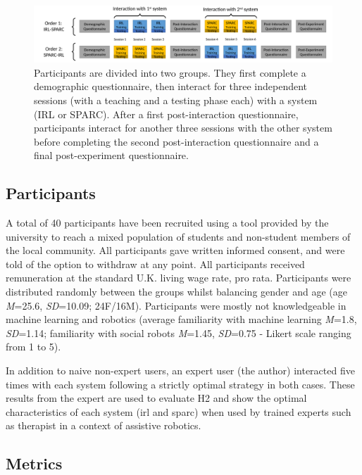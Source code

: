 \begin{figure}[t!]
	\centering
	\includegraphics[width=1\textwidth]{fullDesign.pdf}
	\caption{Participants are divided into two groups. They first complete a demographic questionnaire, then interact for three independent sessions (with a teaching and a testing phase each) with a system (IRL or SPARC). After a first post-interaction questionnaire, participants interact for another three sessions with the other system before completing the second post-interaction questionnaire and a final post-experiment questionnaire.}
	\label{fig:control_design}
\end{figure}

\subsection{Participants}

A total of 40 participants have been recruited using a tool provided by the university to reach a mixed population of students and non-student members of the local community.  All participants gave written informed consent, and were told of the option to withdraw at any point. All participants received remuneration at the standard U.K. living wage rate, pro rata. Participants were distributed randomly between the groups whilst balancing gender and age (age \textit{M}=25.6, \textit{SD}=10.09; 24F/16M). Participants were mostly not knowledgeable in machine learning and robotics (average familiarity with machine learning \textit{M}=1.8, \textit{SD}=1.14; familiarity with social robots \textit{M}=1.45, \textit{SD}=0.75 - Likert scale ranging from 1 to 5).

In addition to naive non-expert users, an expert user (the author) interacted five times with each system following a strictly optimal strategy in both cases. These results from the expert are used to evaluate H2 and show the optimal characteristics of each system (\gls{irl} and \gls{sparc}) when used by trained experts such as therapist in a context of assistive robotics.

\subsection{Metrics}

